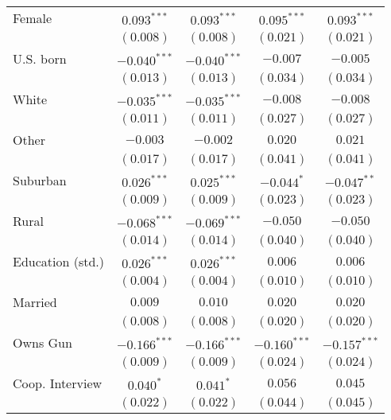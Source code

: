 \begin{table}
\begin{center}
\begin{tabular}{l c c c c}
Female                  & $0.093^{***}$  & $0.093^{***}$  & $0.095^{***}$  & $0.093^{***}$  \\
                        & $(0.008)$      & $(0.008)$      & $(0.021)$      & $(0.021)$      \\
U.S. born               & $-0.040^{***}$ & $-0.040^{***}$ & $-0.007$       & $-0.005$       \\
                        & $(0.013)$      & $(0.013)$      & $(0.034)$      & $(0.034)$      \\
White                   & $-0.035^{***}$ & $-0.035^{***}$ & $-0.008$       & $-0.008$       \\
                        & $(0.011)$      & $(0.011)$      & $(0.027)$      & $(0.027)$      \\
Other                   & $-0.003$       & $-0.002$       & $0.020$        & $0.021$        \\
                        & $(0.017)$      & $(0.017)$      & $(0.041)$      & $(0.041)$      \\
Suburban                & $0.026^{***}$  & $0.025^{***}$  & $-0.044^{*}$   & $-0.047^{**}$  \\
                        & $(0.009)$      & $(0.009)$      & $(0.023)$      & $(0.023)$      \\
Rural                   & $-0.068^{***}$ & $-0.069^{***}$ & $-0.050$       & $-0.050$       \\
                        & $(0.014)$      & $(0.014)$      & $(0.040)$      & $(0.040)$      \\
Education (std.)        & $0.026^{***}$  & $0.026^{***}$  & $0.006$        & $0.006$        \\
                        & $(0.004)$      & $(0.004)$      & $(0.010)$      & $(0.010)$      \\
Married                 & $0.009$        & $0.010$        & $0.020$        & $0.020$        \\
                        & $(0.008)$      & $(0.008)$      & $(0.020)$      & $(0.020)$      \\
Owns Gun                & $-0.166^{***}$ & $-0.166^{***}$ & $-0.160^{***}$ & $-0.157^{***}$ \\
                        & $(0.009)$      & $(0.009)$      & $(0.024)$      & $(0.024)$      \\
Coop. Interview         & $0.040^{*}$    & $0.041^{*}$    & $0.056$        & $0.045$        \\
                        & $(0.022)$      & $(0.022)$      & $(0.044)$      & $(0.045)$      \\

\end{tabular}
\end{center}
\end{table}
